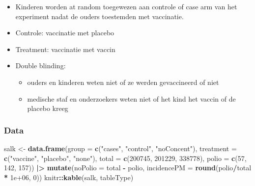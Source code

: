 \documentclass[
  12pt,dutch]{book}
\newenvironment{Shaded}{\begin{snugshade}}{\end{snugshade}}
\newcommand{\AttributeTok}[1]{\textcolor[rgb]{0.13,0.29,0.53}{#1}}
\newcommand{\DecValTok}[1]{\textcolor[rgb]{0.00,0.00,0.81}{#1}}
\newcommand{\FloatTok}[1]{\textcolor[rgb]{0.00,0.00,0.81}{#1}}
\newcommand{\FunctionTok}[1]{\textcolor[rgb]{0.13,0.29,0.53}{\textbf{#1}}}
\newcommand{\NormalTok}[1]{#1}
\newcommand{\OtherTok}[1]{\textcolor[rgb]{0.56,0.35,0.01}{#1}}
\newcommand{\SpecialCharTok}[1]{\textcolor[rgb]{0.81,0.36,0.00}{\textbf{#1}}}
\newcommand{\StringTok}[1]{\textcolor[rgb]{0.31,0.60,0.02}{#1}}
\newcounter{none} %
\providecommand{\tightlist}{%
  \setlength{\itemsep}{0pt}\setlength{\parskip}{0pt}}
\theoremstyle{definition}
\theoremstyle{definition}
\theoremstyle{definition}
\theoremstyle{definition}
\theoremstyle{remark}
\begin{document}
\begin{itemize}
\tightlist
\item
  Kinderen worden at random toegewezen aan controle of case arm van het experiment nadat de ouders toestemden met vaccinatie.
\item
  Controle: vaccinatie met placebo
\item
  Treatment: vaccinatie met vaccin
\item
  Double blinding:

  \begin{itemize}
  \tightlist
  \item
    ouders en kinderen weten niet of ze werden gevaccineerd of niet
  \item
    medische staf en onderzoekers weten niet of het kind het vaccin of de placebo kreeg
  \end{itemize}
\end{itemize}

\subsubsection{Data}\label{data-1}

\begin{Shaded}
\begin{Highlighting}[]
\NormalTok{salk }\OtherTok{\textless{}{-}} \FunctionTok{data.frame}\NormalTok{(}\AttributeTok{group =} \FunctionTok{c}\NormalTok{(}\StringTok{"cases"}\NormalTok{, }\StringTok{"control"}\NormalTok{, }\StringTok{"noConcent"}\NormalTok{),}
    \AttributeTok{treatment =} \FunctionTok{c}\NormalTok{(}\StringTok{"vaccine"}\NormalTok{, }\StringTok{"placebo"}\NormalTok{, }\StringTok{"none"}\NormalTok{), }\AttributeTok{total =} \FunctionTok{c}\NormalTok{(}\DecValTok{200745}\NormalTok{,}
        \DecValTok{201229}\NormalTok{, }\DecValTok{338778}\NormalTok{), }\AttributeTok{polio =} \FunctionTok{c}\NormalTok{(}\DecValTok{57}\NormalTok{, }\DecValTok{142}\NormalTok{, }\DecValTok{157}\NormalTok{)) }\SpecialCharTok{|\textgreater{}}
    \FunctionTok{mutate}\NormalTok{(}\AttributeTok{noPolio =}\NormalTok{ total }\SpecialCharTok{{-}}\NormalTok{ polio, }\AttributeTok{incidencePM =} \FunctionTok{round}\NormalTok{(polio}\SpecialCharTok{/}\NormalTok{total }\SpecialCharTok{*}
        \FloatTok{1e+06}\NormalTok{, }\DecValTok{0}\NormalTok{))}
\NormalTok{knitr}\SpecialCharTok{::}\FunctionTok{kable}\NormalTok{(salk, tableType)}
\end{Highlighting}
\end{Shaded}
\end{document}

